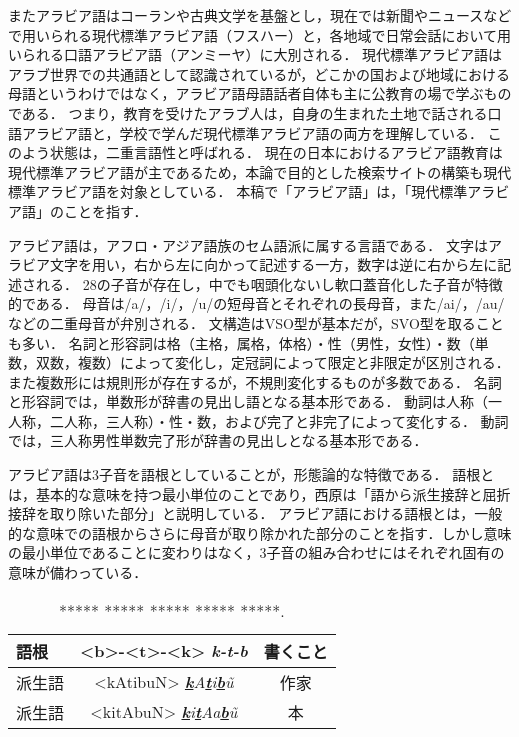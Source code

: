 \documentclass[technicalreport]{ieicej}
\begin{document}
またアラビア語はコーランや古典文学を基盤とし，現在では新聞やニュースなどで用いられる現代標準アラビア語（フスハー）と，各地域で日常会話において用いられる口語アラビア語（アンミーヤ）に大別される．
現代標準アラビア語はアラブ世界での共通語として認識されているが，どこかの国および地域における母語というわけではなく，アラビア語母語話者自体も主に公教育の場で学ぶものである．
つまり，教育を受けたアラブ人は，自身の生まれた土地で話される口語アラビア語と，学校で学んだ現代標準アラビア語の両方を理解している．
このよう状態は，二重言語性と呼ばれる．
現在の日本におけるアラビア語教育は現代標準アラビア語が主であるため，本論で目的とした検索サイトの構築も現代標準アラビア語を対象としている．
本稿で「アラビア語」は，「現代標準アラビア語」のことを指す．

アラビア語は，アフロ・アジア語族のセム語派に属する言語である．
文字はアラビア文字を用い，右から左に向かって記述する一方，数字は逆に右から左に記述される．
28の子音が存在し，中でも咽頭化ないし軟口蓋音化した子音が特徴的である．
母音は/a/，/i/，/u/の短母音とそれぞれの長母音，また/ai/，/au/などの二重母音が弁別される．
文構造はVSO型が基本だが，SVO型を取ることも多い．
名詞と形容詞は格（主格，属格，体格）・性（男性，女性）・数（単数，双数，複数）によって変化し，定冠詞によって限定と非限定が区別される．
また複数形には規則形が存在するが，不規則変化するものが多数である．
名詞と形容詞では，単数形が辞書の見出し語となる基本形である．
動詞は人称（一人称，二人称，三人称）・性・数，および完了と非完了によって変化する．
動詞では，三人称男性単数完了形が辞書の見出しとなる基本形である．

アラビア語は3子音を語根としていることが，形態論的な特徴である．
語根とは，基本的な意味を持つ最小単位のことであり，西原\cite{nishihara2012}は「語から派生接辞と屈折接辞を取り除いた部分」と説明している．
アラビア語における語根とは，一般的な意味での語根からさらに母音が取り除かれた部分のことを指す．しかし意味の最小単位であることに変わりはなく，3子音の組み合わせにはそれぞれ固有の意味が備わっている．

\begin{table}[ht]
\begin{center}
\begin{tabular}{l|cc}
   語根& <b>-<t>-<k> \textit{\textbf{k-t-b}} & 書くこと\\
  \hline
 派生語& <kAtibuN>  \textit{\underline{\textbf{k}}A\underline{\textbf{t}}i\underline{\textbf{b}}\~u}& 作家\\
  派生語& <kitAbuN>  \textit{\underline{\textbf{k}}i\underline{\textbf{t}}Aa\underline{\textbf{b}}\~u} & 本\\
\hline
\end{tabular}
\caption{***** ***** ***** ***** *****.}
\label{table:alignment}
\end{center}
\end{table}
\end{document}
